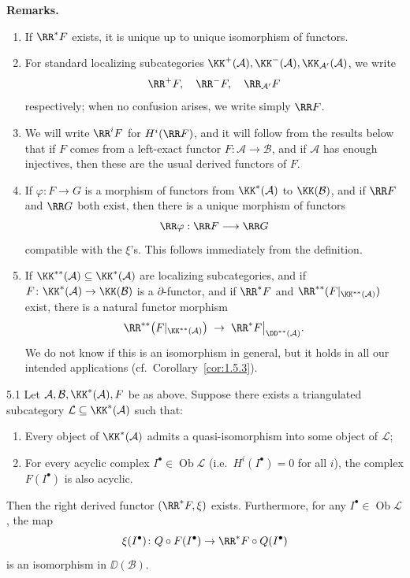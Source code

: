 \textbf{Remarks.}
\begin{enumerate}
\item If $\RR^*F$ exists, it is unique up to unique isomorphism of functors.
\item For standard localizing subcategories $\KK^+(\mathcal{A}),\KK^-(\mathcal{A}),\KK_{\mathcal{A}'}(\mathcal{A})$, we write
\[
\RR^+F,\quad \RR^-F,\quad \RR_{\mathcal{A}'}F
\]
respectively; when no confusion arises, we write simply $\RR F$.

\item We will write \(\RR^i F\) for \(H^i(\RR F)\), and it will follow from the results below that if \(F\) comes from a left-exact functor \(F\colon\mathcal{A}\longrightarrow\mathcal{B}\), and if \(\mathcal{A}\) has enough injectives, then these are the usual derived functors of \(F\).

\item If \(\varphi: F \longrightarrow G\) is a morphism of functors from \(\KK^*(\mathcal{A})\) to \(\KK(\mathcal{B})\), and if \(\RR F\) and \(\RR G\) both exist, then there is a unique morphism of functors
\[
\RR \varphi: \RR F \longrightarrow \RR G
\]
compatible with the \(\xi\)'s. This follows immediately from the definition.
\item If $\KK^{**}(\mathcal{A})\subseteq\KK^*(\mathcal{A})$ are localizing subcategories, and if $F\colon\KK^*(\mathcal{A})\to\KK(\mathcal{B})$ is a $\partial$-functor, and if $\RR^*F$ and $\RR^{**}(F|_{\KK^{**}(\mathcal{A})})$ exist, there is a natural functor morphism
\[
\RR^{**}\big(F|_{\KK^{**}(\mathcal{A})}\big)
\;\to\;
\RR^*F\big|_{\DD^{**}(\mathcal{A})}.
\]
We do not know if this is an isomorphism in general, but it holds in all our intended applications (cf.\ Corollary~\ref{cor:1.5.3}).
\end{enumerate}

\begin{booktheorem}{5.1}\label{thm:1.5.1}
Let $\mathcal{A},\mathcal{B},\KK^*(\mathcal{A}),F$ be as above. Suppose there exists a triangulated subcategory $\mathcal{L}\subseteq\KK^*(\mathcal{A})$ such that:
\begin{enumerate}
\item[(1)] Every object of $\KK^*(\mathcal{A})$ admits a quasi-isomorphism into some object of $\mathcal{L}$;
\item[(2)] For every acyclic complex $I^\bullet\in\operatorname{Ob}\mathcal{L}$ (i.e.\ $H^i(I^\bullet)=0$ for all $i$), the complex $F(I^\bullet)$ is also acyclic.
\end{enumerate}
Then the right derived functor $(\RR^*F,\xi)$ exists. Furthermore, for any $I^\bullet\in\operatorname{Ob}\mathcal{L}$, the map
\[
\xi(I^\bullet)\colon Q\circ F(I^\bullet) \to \RR^*F\circ Q(I^\bullet)
\]
is an isomorphism in $\DD(\mathcal{B})$.
\end{booktheorem}


